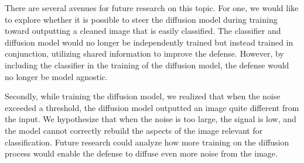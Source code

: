 There are several avenues for future research on this topic. For one, we would like to explore whether it is possible to steer the diffusion model during training toward outputting a cleaned image that is easily classified. The classifier and diffusion model would no longer be independently trained but instead trained in conjunction, utilizing shared information to improve the defense. However, by including the classifier in the training of the diffusion model, the defense would no longer be model agnostic.

Secondly, while training the diffusion model, we realized that when the noise exceeded a threshold, the diffusion model outputted an image quite different from the input. We hypothesize that when the noise is too large, the signal is low, and the model cannot correctly rebuild the aspects of the image relevant for classification. Future research could analyze how more training on the diffusion process would enable the defense to diffuse even more noise from the image.  